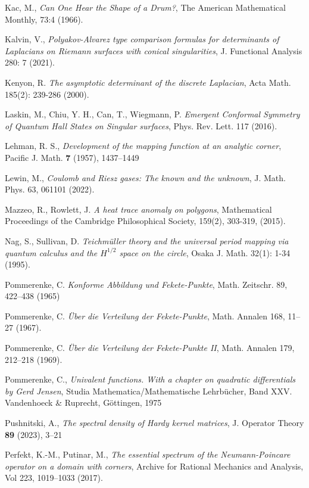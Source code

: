 \documentclass{article}
\numberwithin{equation}{section}
\numberwithin{figure}{section}
\theoremstyle{plain}
\theoremstyle{plain}
\numberwithin{thm}{section}
\theoremstyle{remark}
\begin{document}
\begin{thebibliography}{99}
 Kac, M.,  \emph{Can One Hear the Shape of a Drum?}, The American Mathematical Monthly,  73:4 (1966).

 Kalvin, V., \emph{{P}olyakov-{A}lvarez type comparison formulas for determinants of {L}aplacians on {R}iemann surfaces with conical singularities}, J. Functional Analysis 280: 7 (2021).

 Kenyon, R. \emph{The asymptotic determinant of the discrete {L}aplacian}, Acta Math. 185(2): 239-286 (2000). 

 Laskin, M., Chiu, Y. H., Can, T., Wiegmann, P. \emph{Emergent Conformal Symmetry of Quantum Hall States on Singular surfaces}, Phys. Rev. Lett. 117 (2016).


 Lehman, R. S., \emph{Development of the mapping function at an analytic corner}, Pacific J. Math. {\bf 7} (1957), 1437--1449

 Lewin, M., \emph{{C}oulomb and {R}iesz gases: {T}he known and the unknown}, J. Math. Phys. 63, 061101 (2022).

 Mazzeo, R., Rowlett, J.  \emph{A heat trace anomaly on polygons}, Mathematical Proceedings of the Cambridge Philosophical Society, 159(2), 303-319, (2015).

 Nag, S., Sullivan, D. \emph{Teichm\"uller theory and the universal period mapping via quantum calculus and the $H^{1/2}$ space on the circle}, Osaka J. Math. 32(1): 1-34 (1995).

 Pommerenke, C. \emph{Konforme Abbildung und Fekete-Punkte}, Math. Zeitschr. 89, 422--438 (1965)

 Pommerenke, C. \emph{\"Uber die Verteilung der {F}ekete-{P}unkte}, Math. Annalen 168, 11--27 (1967).

 Pommerenke, C. \emph{\"Uber die Verteilung der {F}ekete-{P}unkte {II}}, Math. Annalen 179, 212--218 (1969).


 Pommerenke, C.,  \emph{Univalent functions. With a chapter on quadratic differentials by Gerd Jensen}, Studia Mathematica/Mathematische Lehrb\"ucher, Band XXV. Vandenhoeck \& Ruprecht, G\"ottingen, 1975

 Pushnitski, A., \emph{The spectral density of Hardy kernel matrices}, J. Operator Theory {\bf 89} (2023), 3--21

 Perfekt, K.-M., Putinar, M., \emph{The essential spectrum of the Neumann-Poincare operator on a domain with corners}, Archive for Rational Mechanics and Analysis, Vol 223, 1019--1033 (2017).


\end{thebibliography}
\end{document}
